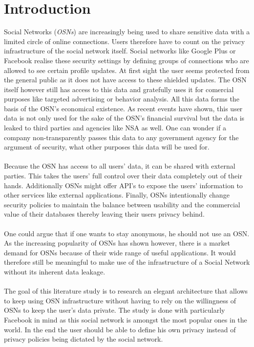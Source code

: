 \documentclass[journal]{IEEEtran}
\begin{document}
\section{Introduction} \label{sec:introduction}
 Social Networks (\textit{OSNs}) are increasingly being
used to share sensitive data with a limited circle of online connections. Users
therefore have to count on the privacy infrastructure of the social network
itself. Social networks like Google Plus or Facebook realise these security
settings by defining groups of connections who are allowed to see certain
profile updates. At first sight the user seems protected from the general public
as it does not have access to these shielded updates. The OSN itself however
still has access to this data and gratefully uses it for comercial purposes like
targeted advertising or behavior analysis. All this data forms the basis of the
OSN's economical existence. As recent events have shown, this user data is not
only used for the sake of the OSN's financial survival but the data is leaked to
third parties and agencies like NSA as well. One can wonder if a company
non-transparently passes this data to any government agency for the argument of
security, what other purposes this data will be used for.\\
\\
Because the OSN has access to all users' data, it can be shared with external
parties. This takes the users' full control over their data completely out of
their hands. Additionally OSNs might offer API's to expose the users'
information to other services like external applications. Finally, OSNs
intentionally change security policies to maintain the balance between
usability and the commercial value of their databases thereby leaving their
users privacy behind.~\cite{BeatoScramble}\\
\\
One could argue that if one wants to stay anonymous, he should not use an OSN.
As the increasing popularity of OSNs has shown however, there is a market
demand for OSNs because of their wide range of useful applications. It would
therefore still be meaningful to make use of the infrastructure of a Social
Network without its inherent data leakage.\\
\\
The goal of this literature study is to research an elegant architecture that
allows to keep using OSN infrastructure without having to rely on the
willingness of OSNs to keep the user's data private. The study is done with
particularly Facebook in mind as this social network is amongst the most
popular ones in the world. In the end the user should be able to define his
own privacy instead of privacy policies being dictated by the social network.
\end{document}
